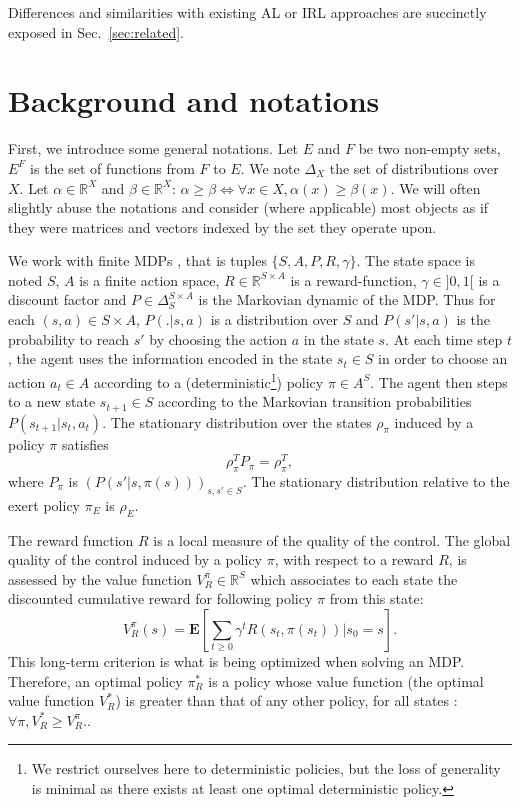 \documentclass[smallextended]{svjour3}
\newcommand{\E}{\mathbf{E}}
\begin{document}
Differences and similarities with existing AL or IRL approaches are succinctly exposed in Sec.~\ref{sec:related}.
\section{Background and notations}
\label{sec:background}
First, we introduce some general notations.
Let $E$ and $F$ be two non-empty sets, $E^F$ is the set of functions from $F$ to $E$.
We note $\Delta_X$ the set of distributions over $X$.
Let $\alpha\in\mathbb{R}^X$ and $\beta\in\mathbb{R}^X$: $\alpha\geq\beta \Leftrightarrow \forall x\in X, \alpha(x) \geq \beta(x)$. We will often slightly abuse the notations and consider (where applicable) most objects as if they were matrices and vectors indexed by the set they operate upon.

We work with finite MDPs \cite{puterman1994markov}, that is tuples $\{S,A,P,R,\gamma\}$. The state space is noted $S$, $A$ is a finite action space, $R\in\mathbb{R}^{S\times A}$ is a reward-function, $\gamma\in ]0,1[$ is a discount factor and $P\in \Delta_{S}^{S\times A}$ is the Markovian dynamic of the MDP. Thus for each $(s,a)\in S\times A$, $P(.|s,a)$ is a distribution over $S$ and $P(s'|s,a)$ is the probability to reach $s'$ by choosing the action $a$ in the state $s$. At each time step $t$, the agent uses the information encoded in the state $s_t\in S$ in order to choose an action $a_t \in A$ according to a (deterministic\footnote{We restrict ourselves here to deterministic policies, but the loss of generality is minimal as there exists at least one optimal deterministic policy.}) policy $\pi\in A^S$. The agent then steps to a new state $s_{t+1}\in S$ according to the Markovian transition probabilities $P(s_{t+1}|s_t,a_t)$. The stationary distribution over the states $\rho_\pi$ induced by a policy $\pi$ satisfies
\begin{equation}
  \rho_\pi^TP_\pi = \rho_\pi^T,
  \end{equation}
where $P_\pi$ is $(P(s'|s,\pi(s)))_{s,s' \in S}$. The stationary distribution relative to the exert policy $\pi_E$ is $\rho_E$.

The reward function $R$ is a local measure of the quality of the control. The global quality of the control induced by a policy $\pi$, with respect to a reward $R$, is assessed by the value function $V^\pi_R \in \mathbb{R}^{S}$ which associates to each state the discounted cumulative reward for following policy $\pi$ from this state:
\begin{equation}
V^\pi_R(s) = \E[\sum_{t\geq 0}\gamma^tR(s_t,\pi(s_t))|s_0 = s].
\end{equation}
This long-term criterion is what is being optimized when solving an MDP. Therefore, an optimal policy $\pi^*_R$ is a policy whose value function (the optimal value function $V^*_R$) is greater than that of any other policy, for all states : $\forall \pi, V^*_R\geq V^\pi_R$..
\end{document}
